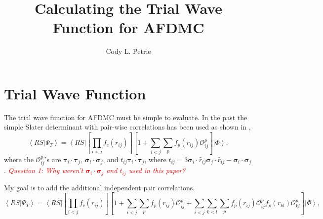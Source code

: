 \documentclass[12pt]{extarticle}
\title{Calculating the Trial Wave Function for AFDMC}
\author{Cody L. Petrie}
\newcommand{\Oijp}{\mathcal{O}^p_{ij}}
\newcommand{\Oklp}{\mathcal{O}^p_{kl}}
\newcommand{\ket}[1]{\left| #1 \right>}
\newcommand{\bra}[1]{\left< #1 \right|}
\newcommand{\braket}[2]{\left< #1 | #2 \right>}
\newcommand{\taui}{\bm{\tau}_i}
\newcommand{\tauj}{\bm{\tau}_j}
\newcommand{\sigmai}{\bm{\sigma}_i}
\newcommand{\sigmaj}{\bm{\sigma}_j}
\newcommand{\tauij}{\taui \cdot \tauj}
\newcommand{\sigmaij}{\sigmai \cdot \sigmaj}
\newcommand{\mycolor}[1]{\textit{\textcolor{red}{#1}}}
\begin{document}
\maketitle

\section{Trial Wave Function}
The trial wave function for AFDMC must be simple to evaluate. In the past the simple Slater determinant with pair-wise correlations has been used as shown in \cite{gandolfi2014},
\begin{equation}
  \braket{RS}{\Psi_T} = \bra{RS} \left[ \prod_{i<j}f_c(r_{ij}) \right] \left[ 1+\sum_{i<j}\sum_p f_p(r_{ij})\Oijp \right] \ket{\Phi},
  \label{equ:simpletrial}
\end{equation}
where the $\Oijp$'s are $\tauij$, $\sigmaij$, and $t_{ij}\tauij$, where $t_{ij} = 3\sigmai \cdot \hat{r}_{ij} \sigmaj \cdot \hat{r}_{ij}-\sigmaij$. \mycolor{Question 1: Why weren't $\sigmaij$ and $t_{ij}$ used in this paper?}

My goal is to add the additional independent pair correlations.
\begin{equation}
  \braket{RS}{\Psi_T} = \bra{RS} \left[ \prod_{i<j}f_c(r_{ij}) \right] \left[ 1+\sum_{i<j}\sum_p f_p(r_{ij})\Oijp + \sum_{i<j}\sum_{k<l}\sum_p f_p(r_{ij})\Oijp f_p(r_{kl})\Oklp \right] \ket{\Phi},
\end{equation}
\end{document}
